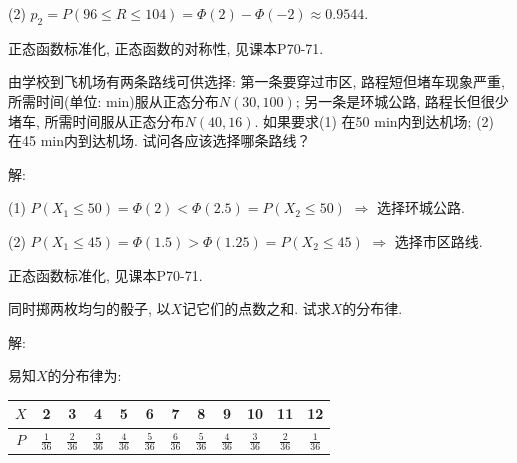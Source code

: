 \documentclass[standard]{ExBook}
\begin{document}
\begin{qitems}
\begin{bbox}
(2) $p_{2}=P(96\leq R\leq 104)=\Phi(2)-\Phi(-2)\approx0.9544$.

\textcolor{themeColor}{\selectfont {} 正态函数标准化, 正态函数的对称性, 见课本P70-71.}
    \end{bbox}

\vspace{-5em}

    \begin{bbox}
    \begin{shaded}
        \qitem
由学校到飞机场有两条路线可供选择: 第一条要穿过市区, 路程短但堵车现象严重, 所需时间(单位: min)服从正态分布$N(30,100)$; 另一条是环城公路, 路程长但很少堵车, 所需时间服从正态分布$N(40,16)$. 如果要求(1) 在50 min内到达机场; (2) 在45 min内到达机场. 试问各应该选择哪条路线？
    \end{shaded}
    \end{bbox}

\vspace{-5em}

    \begin{bbox}
解: 

(1) $P(X_{1}\leq50)=\Phi(2)<\Phi(2.5)=P(X_{2}\leq50)$ $\Longrightarrow$ 选择环城公路.

(2) $P(X_{1}\leq45)=\Phi(1.5)>\Phi(1.25)=P(X_{2}\leq45)$ $\Longrightarrow$ 选择市区路线.

\textcolor{themeColor}{\selectfont {} 正态函数标准化, 见课本P70-71.}
    \end{bbox}

\vspace{-5em}

    \begin{bbox}
    \begin{shaded}
        \qitem
同时掷两枚均匀的骰子, 以$X$记它们的点数之和. 试求$X$的分布律.
    \end{shaded}
    \end{bbox}

\vspace{-5em}

    \begin{bbox}
解: 

易知$X$的分布律为:
\begin{center}
\setlength{\tabcolsep}{12pt}
\begin{tabular}{c|ccccccccccc}
    \hline
    $X$ & 2 & 3 & 4 & 5 & 6 & 7 & 8 & 9 & 10 & 11 & 12\\
    \hline
    $P$ & $\frac{1}{36}$ & $\frac{2}{36}$ & $\frac{3}{36}$ & $\frac{4}{36}$ & $\frac{5}{36}$ & $\frac{6}{36}$ & $\frac{5}{36}$ & $\frac{4}{36}$ & $\frac{3}{36}$ & $\frac{2}{36}$ & $\frac{1}{36}$ \\
    \hline
\end{tabular}
\end{center}
    \end{bbox}


\end{qitems}
\end{document}
